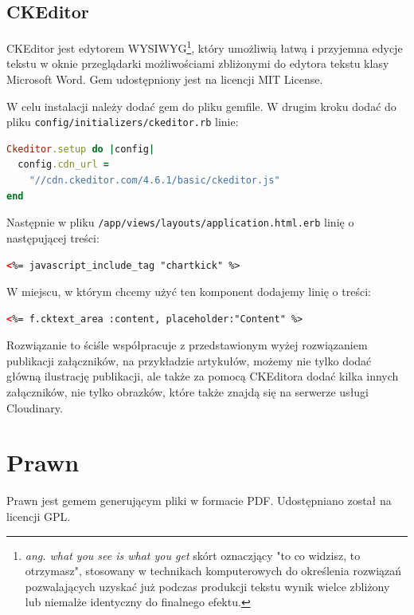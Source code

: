 \documentclass[openright]{xmgr}
\begin{document}
\subsection{CKEditor}
CKEditor \cite{ckeditor} jest edytorem WYSIWYG\footnote{\textit{ang. what you see is what you get} skórt oznaczjący "to co widzisz, to otrzymasz", stosowany w technikach komputerowych do określenia rozwiązań pozwalających uzyskać już podczas produkcji tekstu wynik wielce zbliżony lub niemalże identyczny do finalnego efektu.}, który umożliwią łatwą i przyjemna edycje tekstu w oknie przeglądarki możliwościami zbliżonymi do edytora tekstu klasy Microsoft Word. Gem udostępniony jest na licencji MIT License. 

W celu instalacji należy dodać gem do pliku gemfile. W drugim kroku dodać do pliku \texttt{config/initializers/ckeditor.rb} linie: 
\begin{lstlisting}[language=ruby, caption={Framgent zawartości pliku ckeditor.rb}]
Ckeditor.setup do |config|
  config.cdn_url = 
	"//cdn.ckeditor.com/4.6.1/basic/ckeditor.js"
end
\end{lstlisting}

\newpage

Następnie w pliku \texttt{/app/views/layouts/application.html.erb} linię o następującej treści:
\begin{lstlisting}[language=html, caption={Framgent zawartości pliku application.html.rb}]
<%= javascript_include_tag "chartkick" %>
\end{lstlisting}
W miejscu, w którym chcemy użyć ten komponent dodajemy linię o treści:
\begin{lstlisting}[language=html, caption={Kod uruchamiajacy edytor}]
<%= f.cktext_area :content, placeholder:"Content" %>
\end{lstlisting}
Rozwiązanie to ściśle współpracuje z przedstawionym wyżej rozwiązaniem publikacji załączników, na przykładzie artykułów, możemy nie tylko dodać główną ilustrację publikacji, ale także za pomocą CKEditora dodać kilka innych załączników, nie tylko obrazków, które także znajdą się na serwerze usługi Cloudinary. 

\newpage

\section{Prawn}
Prawn \cite{prawn} jest gemem generującym pliki w formacie PDF. Udostępniano został na licencji GPL.
\end{document}
